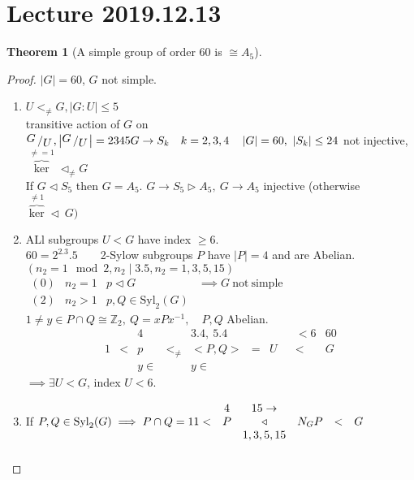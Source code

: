\documentclass{article}
\makeatletter
\newcommand{\Z}{\mathbb{Z}}
\newcommand{\quotient}[2]{{\raisebox{.2em}{$#1$}\left/\raisebox{-.2em}{$#2$}\right.}}
\newcommand{\abs}[1]{\left|#1\right|}
\newcommand{\tsubgp}{\triangleleft}
\newcommand{\tsupgp}{\triangleright}
\newtheorem{theorem}{Theorem}[section]
\theoremstyle{definition}
\theoremstyle{remark}
\theoremstyle{example}
\newcommand{\skipitems}[1]{%
	\addtocounter{\@enumctr}{#1}%
}
\makeatother
\begin{document}
	\section*{Lecture 2019.12.13}
	\begin{theorem}[A simple group of order 60 is $\cong A_5$]
	\end{theorem}
	\begin{proof}
		$\abs{G}=60$, $G$ not simple.
		\begin{enumerate}
			\item $U <_{\neq} G, \abs{G:U} \leq 5$\\
			transitive action of $G$ on $\quotient{G}{U}, \abs{\quotient{G}{U}}=2345\\
			G \to S_k\quad k=2,3,4 \quad \abs{G}=60,\ \abs{S_k}\leq 24$ not injective, $\overbrace{\ker}^{\neq =1} \tsubgp_{\neq} G$\\
			If $G \tsubgp S_5$ then $G=A_5$.
			$G \to S_5 \tsupgp A_5,\ G \to A_5$ injective (otherwise $\overbrace{\ker}^{\neq 1} \tsubgp\ G )$
			\item ALl subgroups $U < G$ have index $\geq 6$.\\
			$60=2^2.3.5 \qquad $2-Sylow subgroups $P$ have $\abs{P}=4$ and are Abelian.\\
			$(n_2=1 \mod 2, n_2 \mid 3.5, n_2=1,3,5,15)$\\
			$\begin{matrix}
				(0) & n_2 = 1 & p \tsubgp G & \implies G\ \mathrm{not\ simple}\\
				(2) & n_2 > 1 & p,Q \in \mathrm{Syl}_2(G)
			\end{matrix}$\\
			$1\neq y \in P \cap Q \cong \Z_2,\ Q=xPx^{-1},\quad P,Q$ Abelian.
			\[\begin{matrix}
				& &     4 & &         3.4,\ 5.4 & & & & < 6 & 60\\
				1 & < & p & <_{\neq} & <P,Q> & = & U & & < & G\\
				& & y \in & & y \in 
			\end{matrix}\]
			$\implies \exists U < G$, index $U < 6$.
			\skipitems{-2}
			\item If $P,Q \in \mathrm{Syl}_2(G) \implies P \cap Q=1\\
			\begin{matrix}
				& 4 & 15 \to \\  
				1 < & P & \tsubgp & N_GP & < & G\\
				& & 1,3,5,15 
			\end{matrix}$
			\begin{align*}

\end{align*}
\end{enumerate}
\end{proof}
\end{document}
